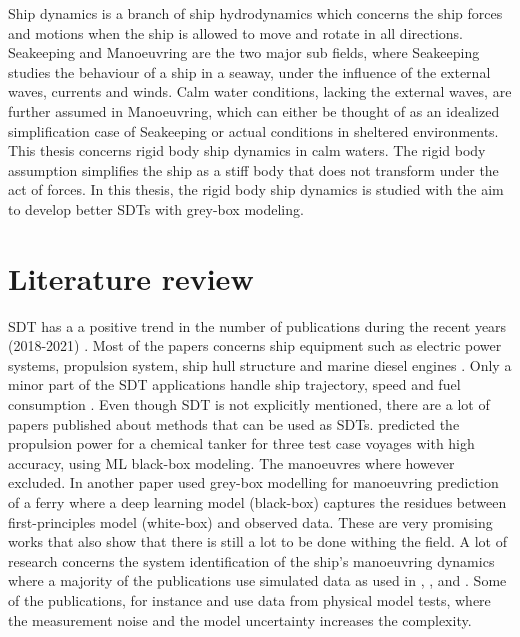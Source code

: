 Ship dynamics is a branch of ship hydrodynamics which concerns the ship forces and motions when the ship is allowed to move and rotate in all directions. Seakeeping and Manoeuvring are the two major sub fields, where Seakeeping studies the  behaviour of a ship in a seaway, under the influence of the external waves, currents and winds. Calm water conditions, lacking the external waves, are further assumed in Manoeuvring, which can either be thought of as an idealized simplification case of Seakeeping or actual conditions in sheltered environments. This thesis concerns rigid body ship dynamics in calm waters. The rigid body assumption simplifies the ship as a stiff body that does not transform under the act of forces. In this thesis, the rigid body ship dynamics is studied with the aim to develop better SDTs with grey-box modeling.

\section{Literature review}
SDT has a a positive trend in the number of publications during the recent years (2018-2021)  \cite{assani_ships_2022}. Most of the papers concerns ship equipment such as electric power systems, propulsion system, ship hull structure and marine diesel engines \cite{assani_ships_2022}. Only a minor part of the SDT applications handle ship trajectory, speed and fuel consumption \cite{assani_ships_2022}.   
Even though SDT is not explicitly mentioned, there are a lot of papers published about methods that can be used as SDTs. \cite{lang_comparison_2022} predicted the propulsion power for a chemical tanker for three test case voyages with high accuracy, using ML black-box modeling. The manoeuvres where however excluded. In another paper \cite{nielsen_machine_2022} used grey-box modelling for manoeuvring prediction of a ferry where a deep learning model (black-box) captures the residues between first-principles model (white-box) and observed data. These are very promising works that also show that there is still a lot to be done withing the field. 
A lot of research concerns the system identification of the ship's manoeuvring dynamics where a majority of the publications use simulated data as used in 
\cite{shi_identification_2009}, \cite{perera_system_2015}, \cite{zhu_parameter_2017} and \cite{wang_parameter_2021}. Some of the publications, for instance \cite{luo_parameter_2016} and \cite{he_nonparametric_2022} use data from physical model tests, where the measurement noise and the model uncertainty increases the complexity. 


